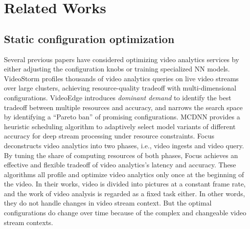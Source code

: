 \section{Related Works}
\label{Section: related_works}

\subsection{Static configuration optimization}
Several previous papers have considered optimizing video analytics services by either adjusting the configuration knobs or training specialized NN models. VideoStorm \cite{zhang2017videostorm} profiles thousands of video analytics queries on live video streams over large clusters, achieving resource-quality tradeoff with multi-dimensional configurations. VideoEdge \cite{hung2018videoedge} introduces \emph{dominant demand} to identify the best tradeoff between multiple resources and accuracy, and narrows the search space by identifying a ``Pareto ban'' of promising configurations. MCDNN \cite{han2016mcdnn} provides a heuristic scheduling algorithm to adaptively select model variants of different accuracy for deep stream processing under resource constraints. Focus \cite{hsieh2018focus} deconstructs video analytics into two phases, i.e., video ingests and video query. By tuning the share of computing resources of both phases, Focus achieves an effective and flexible tradeoff of video analytics's latency and accuracy. These algorithms all profile and optimize video analytics only once at the beginning of the video. In their works, video is divided into pictures at a constant frame rate, and the work of video analysis is regarded as a fixed task either. In other words, they do not handle changes in video stream context. But the optimal configurations do change over time because of the complex and changeable video stream contexts.

